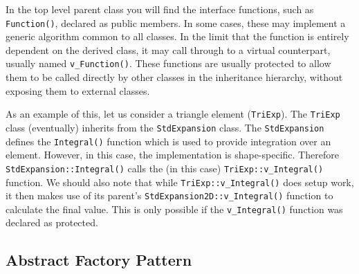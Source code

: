 In the top level parent class you will find the interface functions, such as
\lstinline{Function()}, declared as public members. In some cases, these may implement a generic algorithm common to all classes. In the limit that the function is entirely dependent on the derived class, it may call through to a virtual counterpart, usually named \lstinline{v_Function()}. These functions are usually protected to allow them to be called directly by other classes in the inheritance hierarchy, without exposing them to external classes.

As an example of this, let us consider a triangle
element (\lstinline{TriExp}).  The \lstinline{TriExp} class (eventually) inherits from the \lstinline{StdExpansion} class.  The \lstinline{StdExpansion} defines the \lstinline{Integral()} function which is used to provide integration over an element.  However, in this case, the implementation is shape-specific. Therefore \lstinline{StdExpansion::Integral()} calls the (in this case) \lstinline{TriExp::v_Integral()} function.  We should also note that while \lstinline{TriExp::v_Integral()} does setup work, it then makes use of its parent's \lstinline{StdExpansion2D::v_Integral()} function to calculate the final value. This is only possible if the \lstinline{v_Integral()} function was declared as protected.

\subsection{Abstract Factory Pattern}

